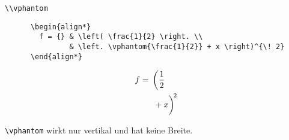 \begin{frame}[fragile]{\lstinline+\\vphantom+}
  \begin{CodeExample}{0.70}
    \begin{lstlisting}
      \begin{align*}
        f = {} & \left( \frac{1}{2} \right. \\
               & \left. \vphantom{\frac{1}{2}} + x \right)^{\! 2}
      \end{align*}
    \end{lstlisting}
  \CodeResult
    \removedisplayskip
    \begin{align*}
      f = {} & \left( \frac{1}{2} \right. \\
             & \left. \vphantom{\frac{1}{2}} + x \right)^{\! 2}
    \end{align*}
  \end{CodeExample}
  \vspace{5pt}
  \lstinline+\vphantom+ wirkt nur vertikal und hat keine Breite.
\end{frame}
